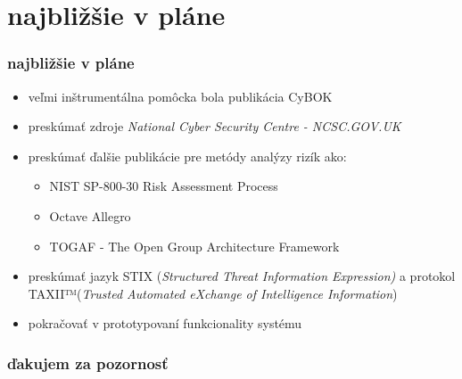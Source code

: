 \documentclass[11pt,xcolor={dvipsnames},hyperref={pdftex,pdfpagemode=UseNone,hidelinks,pdfdisplaydoctitle=true},usepdftitle=false]{beamer}
\begin{document}
\section{najbližšie v pláne}
\begin{frame}
  \frametitle{najbližšie v pláne}
  \begin{itemize}
    \item veľmi inštrumentálna pomôcka bola publikácia CyBOK
    \item preskúmať zdroje \textit{National Cyber Security Centre - NCSC.GOV.UK}
    \item preskúmať ďalšie publikácie pre metódy analýzy rizík ako:
      \begin{itemize}
        \item NIST SP-800-30 Risk Assessment Process
        \item Octave Allegro
        \item TOGAF - The Open Group Architecture Framework
      \end{itemize}
    \item preskúmať jazyk STIX (\textit{Structured Threat Information Expression)}
      a protokol TAXII™(\textit{Trusted Automated eXchange of Intelligence Information})
    \item pokračovať v prototypovaní funkcionality systému
  \end{itemize}
\end{frame}

\begin{frame}
  \frametitle{ďakujem za pozornosť}
\end{frame}
\end{document}
